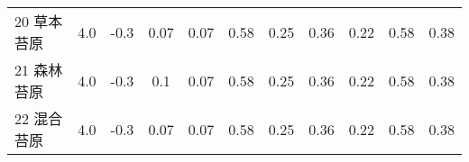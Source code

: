 \begin{sidewaystable}[]
\begin{tabular}{@{}lcccccccccc@{}}
        20 草本苔原    & 4.0        & -0.3                                                                         & 0.07                                                                                                            & 0.07                                                                                                            & 0.58                                                                                                            & 0.25                                                                                                            & 0.36                                                                                                            & 0.22                                                                                                            & 0.58                                                                                                            & 0.38                                                                                                            \\
        21 森林苔原    & 4.0        & -0.3                                                                         & 0.1                                                                                                             & 0.07                                                                                                            & 0.58                                                                                                            & 0.25                                                                                                            & 0.36                                                                                                            & 0.22                                                                                                            & 0.58                                                                                                            & 0.38                                                                                                            \\
        22 混合苔原    & 4.0        & -0.3                                                                         & 0.07                                                                                                            & 0.07                                                                                                            & 0.58                                                                                                            & 0.25                                                                                                            & 0.36                                                                                                            & 0.22                                                                                                            & 0.58                                                                                                            & 0.38                                                                                                            \\

\end{tabular}
\end{sidewaystable}
